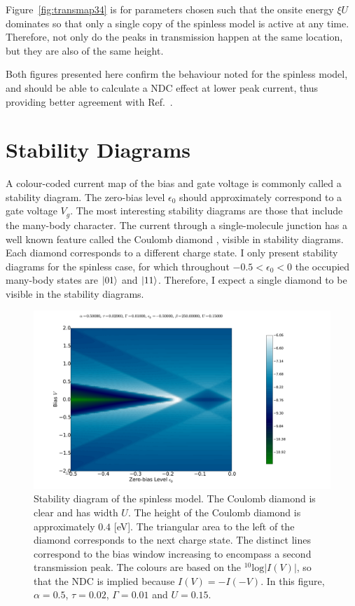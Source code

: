 Figure~\ref{fig:transmap34} is for parameters chosen such that the onsite energy $\xi U$ dominates so that only a single copy of the spinless model is active at any time. Therefore, not only do the peaks in transmission happen at the same location, but they are also of the same height.

\newpage Both figures presented here confirm the behaviour noted for the spinless model, and should be able to calculate a NDC effect at lower peak current, thus providing better agreement with Ref.~\cite{perrinnano}.


\clearpage\section{Stability Diagrams}
\label{sec:twositeparamsweep}
A colour-coded current map of the bias and gate voltage is commonly called a stability diagram. The zero-bias level $\epsilon_0$ should approximately correspond to a gate voltage $V_g$. The most interesting stability diagrams are those that include the many-body character. The current through a single-molecule junction has a well known feature called the Coulomb diamond \cite{seldenthuis, perrin}, visible in stability diagrams. Each diamond corresponds to a different charge state. I only present stability diagrams for the spinless case, for which throughout $-0.5 < \epsilon_0 < 0$ the occupied many-body states are $\ket{01}$ and $\ket{11}$. Therefore, I expect a single diamond to be visible in the stability diagrams.  

\begin{figure}[htb]
    \centering
    \includegraphics[height=.38\textheight]{pdf/coulombd/current_map_u2.pdf}
    \caption{Stability diagram of the spinless model. The Coulomb diamond is clear and has width $U$. The height of the Coulomb diamond is approximately $0.4$ [eV]. The triangular area to the left of the diamond corresponds to the next charge state. The distinct lines correspond to the bias window increasing to encompass a second transmission peak. The colours are based on the $^{10}\text{log}\left|I(V)\right|$, so that the NDC is implied because $I(V) = -I(-V)$. In this figure, $\alpha=0.5$, $\tau=0.02$, $\Gamma = 0.01$ and $U=0.15$.}
    \label{fig:currentmap2}
\end{figure} 

